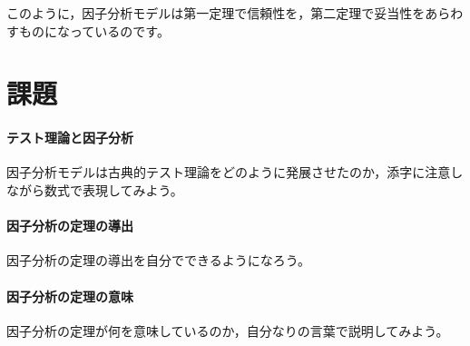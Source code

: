 \documentclass{ltjsbook}
\begin{document}
このように，因子分析モデルは第一定理で信頼性を，第二定理で妥当性をあらわすものになっているのです。

\section{課題}
\paragraph{テスト理論と因子分析} 因子分析モデルは古典的テスト理論をどのように発展させたのか，添字に注意しながら数式で表現してみよう。
\paragraph{因子分析の定理の導出} 因子分析の定理の導出を自分でできるようになろう。
\paragraph{因子分析の定理の意味} 因子分析の定理が何を意味しているのか，自分なりの言葉で説明してみよう。
\end{document}
